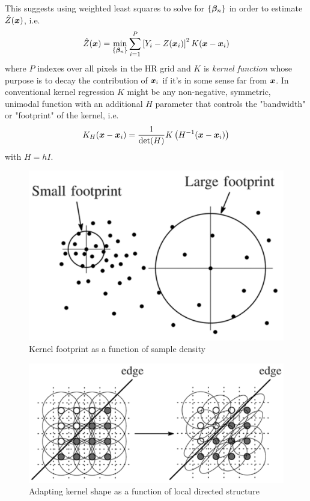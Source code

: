 This suggests using weighted least squares to solve for $\left\{ \bm{\beta}_n \right\}$ in order to estimate $\hat{Z}(\bm{x})$, i.e.
\begin{equation}
    \hat{Z}(\bm{x}) = \min_{\left\{ \bm{\beta}_n \right\}} \sum_{i=1}^{P} \left[ Y_i - Z(\bm{x}_i) \right]^2 K(\bm{x} - \bm{x}_i)
\end{equation}
where $P$ indexes over all pixels in the HR grid and $K$ is \textit{kernel function} whose purpose is to decay the contribution of $\bm{x}_i$ if it's in some sense far from $\bm{x}$.
%
In conventional kernel regression $K$ might be any non-negative, symmetric, unimodal\cite{wand1994kernel} function with an additional $H$ parameter that controls the "bandwidth" or "footprint" of the kernel, i.e.
%
\[
    K_H(\bm{x} - \bm{x}_i) = \frac{1}{\det(H)}K\left( H^{-1}(\bm{x} - \bm{x}_i) \right)
\]
with $H = hI$.
\begin{figure}{}
    \centering
    \includegraphics[width=.8\linewidth]{figures/footprint.png}
    \caption{Kernel footprint as a function of sample density\cite{Takeda2007}}
    \label{fig:footprint}
\end{figure}
\begin{figure}{}
    \centering
    \includegraphics[width=\linewidth]{figures/steering.png}
    \caption{Adapting kernel shape as a function of local directed structure\cite{Takeda2007}}
    \label{fig:steering}
\end{figure}
